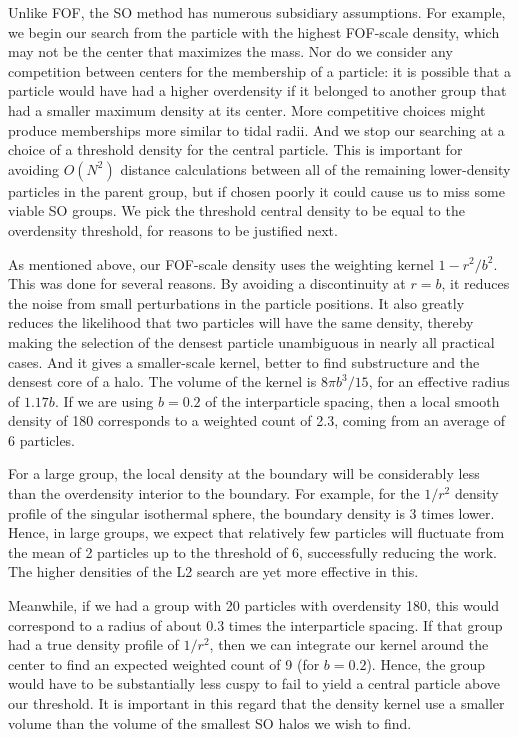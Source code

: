 Unlike FOF, the SO method has numerous subsidiary assumptions.  For
example, we begin our search from the particle with the highest
FOF-scale density, which may not be the center that maximizes the 
mass.  Nor do we consider any competition between centers for the
membership of a particle: it is possible that a particle would have
had a higher overdensity if it belonged to another group that had
a smaller maximum density at its center.  More competitive choices
might produce memberships more similar to tidal radii.  And we stop
our searching at a choice of a threshold density for the central
particle.  This is important for avoiding $O(N^2)$ distance
calculations between all of the remaining lower-density particles 
in the parent group, but if chosen poorly it could cause us to 
miss some viable SO groups.  We pick the threshold central density
to be equal to the overdensity threshold, for reasons to be justified
next.

As mentioned above, our FOF-scale density uses the weighting kernel
$1-r^2/b^2$.  This was done for several reasons.  By avoiding a
discontinuity at $r=b$, it reduces the noise from small perturbations
in the particle positions.  It also greatly reduces the likelihood
that two particles will have the same density, thereby making the
selection of the densest particle unambiguous in nearly all practical
cases.  And it gives a smaller-scale kernel, better to find
substructure and the densest core of a halo.  The volume of the
kernel is $8\pi b^3/15$, for an effective radius of $1.17b$.  If
we are using $b=0.2$ of the interparticle spacing, then a local
smooth density of 180 corresponds to a weighted count of 2.3, coming
from an average of 6 particles.

For a large group, the local density at the boundary will be
considerably less than the overdensity interior to the boundary.
For example, for the $1/r^2$ density profile of the singular
isothermal sphere, the boundary density is 3 times lower.  Hence,
in large groups, we expect that relatively few particles will
fluctuate from the mean of 2 particles up to the threshold of 6,
successfully reducing the work.  The higher densities of the L2
search are yet more effective in this.

Meanwhile, if we had a group with 20 particles with overdensity 180,
this would correspond to a radius of about 0.3 times the interparticle
spacing.  If that group had a true density profile of $1/r^2$, then
we can integrate our kernel around the center to find an expected
weighted count of 9 (for $b=0.2$).  Hence, the group would have to
be substantially less cuspy to fail to yield a central particle
above our threshold.  It is important in this regard that the 
density kernel use a smaller volume than the volume of the smallest
SO halos we wish to find.

